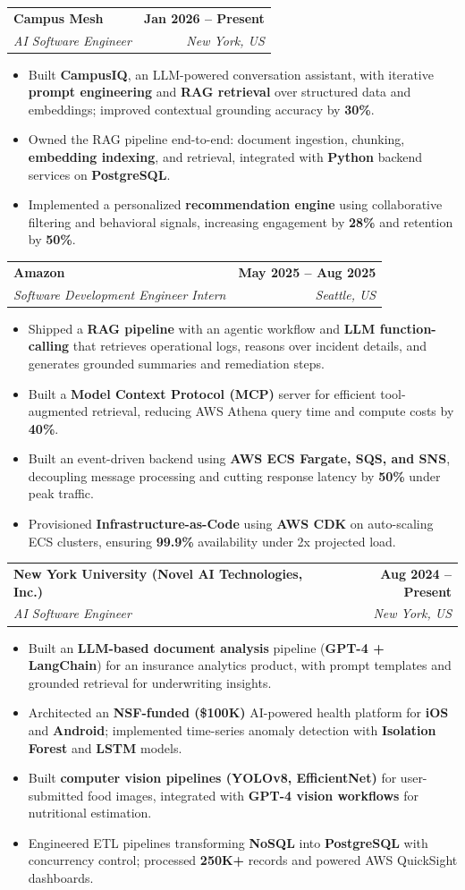 \documentclass[letterpaper,10.5pt]{extarticle}
\makeatletter
\newcommand{\resumeItem}[1]{
\item\small{{#1}\vspace{-3.5pt}}
}
\newcommand{\resumeSubheading}[4]{
\vspace{6pt}
\item
\begin{tabular*}{1.0\textwidth}[t]{l@{\extracolsep{\fill}}r}
\textbf{#1} & \textbf{\small #2} \\
\textit{\small#3} & \textit{\small #4} \\
\end{tabular*}\vspace{-5.5pt}
}
\newcommand{\resumeItemListStart}{\begin{itemize}[leftmargin=*, itemsep=0pt, topsep=0pt]}
\newcommand{\resumeItemListEnd}{\end{itemize}\vspace{-3pt}}
\makeatother
\begin{document}
\resumeSubheading
  {Campus Mesh}{Jan 2026 -- Present}
  {AI Software Engineer}{New York, US}
\resumeItemListStart
  \resumeItem{Built \textbf{CampusIQ}, an LLM-powered conversation assistant, with iterative \textbf{prompt engineering} and \textbf{RAG retrieval} over structured data and embeddings; improved contextual grounding accuracy by \textbf{30\%}.}
  \resumeItem{Owned the RAG pipeline end-to-end: document ingestion, chunking, \textbf{embedding indexing}, and retrieval, integrated with \textbf{Python} backend services on \textbf{PostgreSQL}.}
  \resumeItem{Implemented a personalized \textbf{recommendation engine} using collaborative filtering and behavioral signals, increasing engagement by \textbf{28\%} and retention by \textbf{50\%}.}
\resumeItemListEnd

\resumeSubheading
  {Amazon}{May 2025 -- Aug 2025}
  {Software Development Engineer Intern}{Seattle, US}
\resumeItemListStart
  \resumeItem{Shipped a \textbf{RAG pipeline} with an agentic workflow and \textbf{LLM function-calling} that retrieves operational logs, reasons over incident details, and generates grounded summaries and remediation steps.}
  \resumeItem{Built a \textbf{Model Context Protocol (MCP)} server for efficient tool-augmented retrieval, reducing AWS Athena query time and compute costs by \textbf{40\%}.}
  \resumeItem{Built an event-driven backend using \textbf{AWS ECS Fargate, SQS, and SNS}, decoupling message processing and cutting response latency by \textbf{50\%} under peak traffic.}
  \resumeItem{Provisioned \textbf{Infrastructure-as-Code} using \textbf{AWS CDK} on auto-scaling ECS clusters, ensuring \textbf{99.9\%} availability under 2x projected load.}
\resumeItemListEnd

\resumeSubheading
  {New York University (Novel AI Technologies, Inc.)}{Aug 2024 -- Present}
  {AI Software Engineer}{New York, US}
\resumeItemListStart
  \resumeItem{Built an \textbf{LLM-based document analysis} pipeline (\textbf{GPT-4 + LangChain}) for an insurance analytics product, with prompt templates and grounded retrieval for underwriting insights.}
  \resumeItem{Architected an \textbf{NSF-funded (\$100K)} AI-powered health platform for \textbf{iOS} and \textbf{Android}; implemented time-series anomaly detection with \textbf{Isolation Forest} and \textbf{LSTM} models.}
  \resumeItem{Built \textbf{computer vision pipelines (YOLOv8, EfficientNet)} for user-submitted food images, integrated with \textbf{GPT-4 vision workflows} for nutritional estimation.}
  \resumeItem{Engineered ETL pipelines transforming \textbf{NoSQL} into \textbf{PostgreSQL} with concurrency control; processed \textbf{250K+} records and powered AWS QuickSight dashboards.}
\resumeItemListEnd
\end{document}
